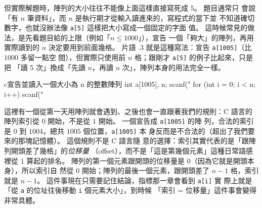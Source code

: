 
但實際解題時，陣列的大小往往不能像上面這樣直接寫死成 $5$。 題目通常只
會說「有 $n$ 筆資料」，而 $n$ 是執行期才從輸入讀進來的，寫程式的當下並
不知道確切數字，也就沒辦法像 \texttt{a[5]} 這樣把大小寫成一個固定的字面
值。 這時候常見的做法，是先看題目給的上限（例如「$n \le 1000$」），宣告
一個「夠大」的陣列，再用實際讀到的 $n$ 決定要用到前面幾格。 片語
\thechapter.3 就是這種寫法：宣告 \texttt{a[1005]}（比 $1000$ 多留一點空
間），但實際只使用前 $n$ 格；跟剛才 \texttt{a[5]} 的例子比起來，只是把
「讀 5 次」換成「先讀 $n$，再讀 $n$ 次」，陣列本身的用法完全一樣。

\begin{code}{c}{宣告並讀入一個大小為 n 的整數陣列}
int a[1005], n;
scanf("%
for (int i = 0; i < n; i++) {
    scanf("%
}
\end{code}


這裡有一個從第一天用陣列就會遇到、之後也會一直跟著我們的規則：C 語言的
陣列索引從 $0$ 開始，不是從 $1$ 開始。 一個宣告成 \texttt{a[1005]} 的陣
列，合法的索引是 $0$ 到 $1004$，總共 $1005$ 個位置，\texttt{a[1005]} 本
身反而是不合法的（超出了我們要來的那塊記憶體）。 這個規則不是 C 語言隨
意的選擇：索引其實代表的是「跟陣列開頭差了幾格」的\emph{位移量}
（offset），而不是「這是第幾個元素」這種日常語感裡從 $1$ 算起的排名。
陣列的第一個元素跟開頭的位移量是 $0$（因為它就是開頭本身），所以索引自
然從 $0$ 開始；陣列的最後一個元素，跟開頭差了 $n - 1$ 格，索引就是
$n - 1$。 這件事現在只需要記住結論，指標那一章會看到 \texttt{a[i]} 實
際上就是「從 \texttt{a} 的位址往後移動 \texttt{i} 個元素大小」，到時候
「索引 = 位移量」這件事會變得非常具體。


\begin{center}
\label{fig:ch06-array-basic}
\end{center}

